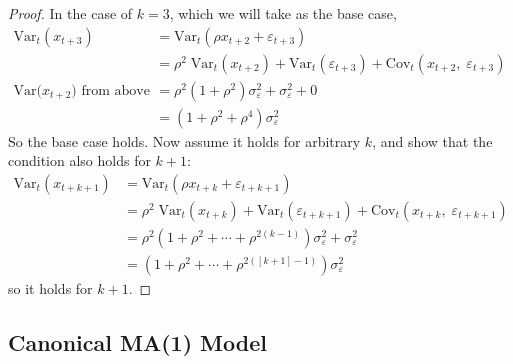 \documentclass[a4paper,12pt]{scrartcl}
\begin{document}
\begin{proof} In the case of $k=3$, which we will take as the base
case,
\begin{align*}
    \text{Var}_t(x_{t+3}) &=  \text{Var}_t(\rho x_{t+2} + \varepsilon_{t+3}) \\
    &=\rho^2 \; \text{Var}_t(x_{t+2}) + \text{Var}_t(\varepsilon_{t+3})
	+ \text{Cov}_t(x_{t+2}, \; \varepsilon_{t+3}) \\
    \text{Var($x_{t+2}$) from above } \quad &= \rho^2 ( 1 + \rho^2) \sigma^2_\varepsilon 
	+ \sigma^2_\varepsilon + 0 \\
    &= (1 + \rho^2 + \rho^4) \sigma^2_\varepsilon 
\end{align*}
So the base case holds.  Now assume it holds for arbitrary $k$,
and show that the condition also holds for $k+1$:
\begin{align*}
    \text{Var}_t(x_{t+k+1}) &= \text{Var}_t(\rho x_{t+k} + 
	\varepsilon_{t+k+1}) \\
    &= \rho^2 \; \text{Var}_t( x_{t+k}) + \text{Var}_t(\varepsilon_{t+k+1})
	+ \text{Cov}_t(x_{t+k}, \; \varepsilon_{t+k+1}) \\
    &= \rho^2 (1 + \rho^2 + \cdots + \rho^{2(k-1)})\sigma^2_\varepsilon
	+ \sigma^2_\varepsilon \\
    &= (1 + \rho^2 + \cdots + \rho^{2([k+1]-1)})\sigma^2_\varepsilon
\end{align*}
so it holds for $k+1$.
\end{proof}

\subsection{Canonical MA(1) Model}
\end{document}
